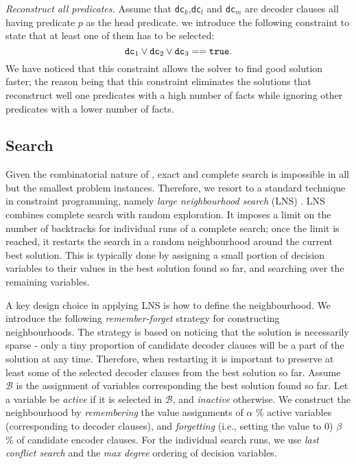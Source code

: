 \textit{Reconstruct all predicates.}
Assume that \texttt{dc}$_k$,\texttt{dc}$_l$ and \texttt{dc}$_m$ are decoder clauses all having predicate $p$ as the head predicate.
we introduce the following constraint to state that at least one of them has to be selected: %
$$ \text{\texttt{dc}}_1 \vee \text{\texttt{dc}}_2 \vee \text{\texttt{dc}}_3 == \text{\texttt{true}}.$$
We have noticed that this constraint allows the solver to find good solution faster; the reason being that this constraint eliminates the solutions that reconstruct well one predicates with a high number of facts while ignoring other predicates with a lower number of facts.



\subsection{Search}

Given the combinatorial nature of , exact and complete search is impossible in all but the smallest problem instances.
Therefore, we resort to a standard technique in constraint programming, namely \textit{large neighbourhood search} (LNS) \cite{Ahuja:2002:SVL:772382.772385}. LNS combines complete search with random exploration.
It imposes a limit on the number of backtracks for individual runs of a complete search; once the limit is reached, it restarts the search in a random neighbourhood around the current best solution. %
This is typically done by assigning a small portion of decision variables to their values in the best solution found so far, and searching over the remaining variables.


A key design choice in applying LNS is how to define the neighbourhood.
We introduce the following \textit{remember-forget} strategy for constructing neighbourhoods.
The strategy is based on noticing that the solution is necessarily sparse - only a tiny proportion of candidate decoder clauses will be a part of the solution at any time.
Therefore, when restarting it is important to preserve at least some of the selected decoder clauses from the best solution so far.
Assume $\mathcal{B}$ is the assignment of variables corresponding the best solution found so far.
Let a variable be \textit{active} if it is selected in $\mathcal{B}$, and \textit{inactive} otherwise.
We construct the neighbourhood by \textit{remembering} the value assignments of $\alpha$ \% active variables (corresponding to decoder clauses), and \textit{forgetting} (i.e., setting the value to 0) $\beta$ \% of candidate encoder clauses.
For the individual search runs, we use \textit{last conflict search} \cite{COS} and the \textit{max degree} ordering of decision variables.




